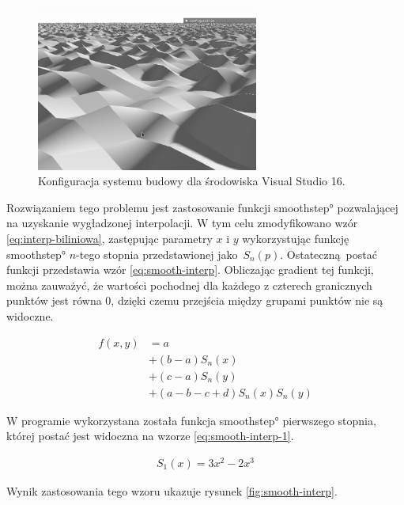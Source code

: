 \begin{figure}
\centering
\includegraphics[width=0.65\textwidth]{./graf/ilin-edges.png}
\caption{Konfiguracja systemu budowy dla środowiska Visual Studio 16.}
\label{fig:linterp-edges}
\end{figure}


Rozwiązaniem tego problemu jest zastosowanie funkcji \ang{smoothstep} pozwalającej na uzyskanie wygładzonej interpolacji. W tym celu zmodyfikowano wzór \ref{eq:interp-biliniowa}, zastępując parametry $x$ i $y$ wykorzystując funkcję \ang{smoothstep} $n$-tego stopnia przedstawionej jako $S_n(p)$. Ostateczną postać funkcji przedstawia wzór \ref{eq:smooth-interp}. Obliczając gradient tej funkcji, można zauważyć, że wartości pochodnej dla każdego z czterech granicznych punktów jest równa $0$, dzięki czemu przejścia między grupami punktów nie są widoczne.

\begin{equation}
\label{eq:smooth-interp}
  \begin{split}
    f(x, y) & = a \\
       & + (b - a) S_n(x) \\
       & + (c - a) S_n(y) \\
       & + (a - b - c + d) S_n(x) S_n(y)
    \end{split}
\end{equation}

W programie wykorzystana została funkcja \ang{smoothstep} pierwszego stopnia, której postać jest widoczna na wzorze \ref{eq:smooth-interp-1}.

\begin{equation}
\label{eq:smooth-interp-1}
  \begin{split}
    S_1(x) = 3x^2 - 2x^3
  \end{split}
\end{equation}

Wynik zastosowania tego wzoru ukazuje rysunek \ref{fig:smooth-interp}.


